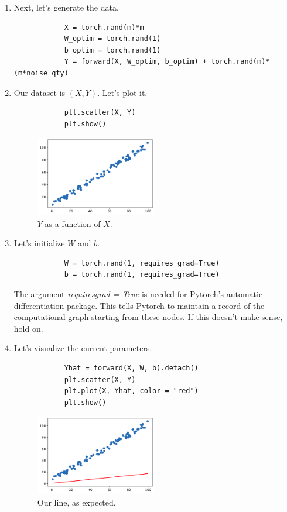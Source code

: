 \documentclass{article}
\begin{document}
\begin{enumerate}
        \item Next, let's generate the data.
        \begin{verbatim}
            X = torch.rand(m)*m
            W_optim = torch.rand(1)
            b_optim = torch.rand(1)
            Y = forward(X, W_optim, b_optim) + torch.rand(m)*(m*noise_qty)
        \end{verbatim}
        \item Our dataset is $(X, Y)$. Let's plot it.
        \begin{verbatim}
            plt.scatter(X, Y)
            plt.show()
        \end{verbatim}
        \begin{figure}[H] \begin{center}
            \includegraphics[width = 0.5\textwidth]{plot1.png}
            \caption{$Y$ as a function of $X$.}
        \end{center} \end{figure}

        \item Let's initialize $W$ and $b$.
        \begin{verbatim}
            W = torch.rand(1, requires_grad=True)
            b = torch.rand(1, requires_grad=True)
        \end{verbatim}
        The argument \emph{requires\textunderscore grad = True} is needed for Pytorch's automatic 
        differentiation package. This tells Pytorch to maintain a record of the computational graph
        starting from these nodes. If this doesn't make sense, hold on.

        \item Let's visualize the current parameters.
        \begin{verbatim}
            Yhat = forward(X, W, b).detach()
            plt.scatter(X, Y)
            plt.plot(X, Yhat, color = "red")
            plt.show()
        \end{verbatim}
        \begin{figure}[H] \begin{center}
            \includegraphics[width = 0.5\textwidth]{plot2.png}
            \caption{Our line, as expected.}
        \end{center} \end{figure}


\end{enumerate}
\end{document}
